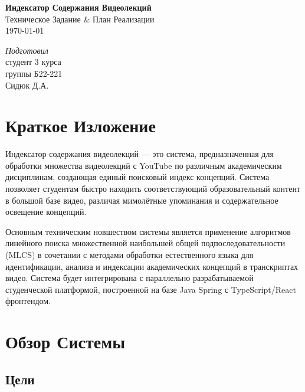 \documentclass[12pt,a4paper]{article}
\begin{document}
\begin{titlepage}
  \begin{center}
    \vspace*{5cm}
    {\Huge \textbf{Индексатор Содержания Видеолекций}}\\
    \vspace{1.5cm}
    {\LARGE Техническое Задание \& План Реализации}\\
    \vspace{3cm}
    {\large \today}\\
    \vfill
  \end{center}

  \begin{flushright}
    \textit{Подготовил} \\
    студент 3 курса \\
    группы Б22-221 \\
    Сидюк Д.А.
  \end{flushright}
  \vspace{1cm}
\end{titlepage}

\tableofcontents
\newpage

\section{Краткое Изложение}

Индексатор содержания видеолекций — это система, предназначенная для обработки множества видеолекций с YouTube по различным академическим дисциплинам, создающая единый поисковый индекс концепций. Система позволяет студентам быстро находить соответствующий образовательный контент в большой базе видео, различая мимолётные упоминания и содержательное освещение концепций.

Основным техническим новшеством системы является применение алгоритмов линейного поиска множественной наибольшей общей подпоследовательности (MLCS) в сочетании с методами обработки естественного языка для идентификации, анализа и индексации академических концепций в транскриптах видео. Система будет интегрирована с параллельно разрабатываемой студенческой платформой, построенной на базе Java Spring с TypeScript/React фронтендом.

\section{Обзор Системы}

\subsection{Цели}
\end{document}
